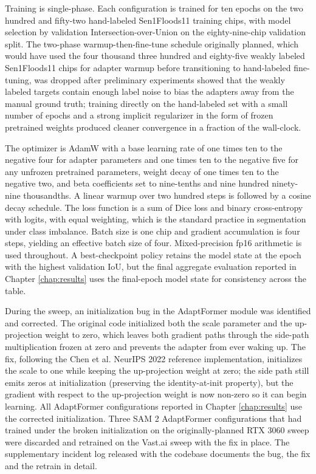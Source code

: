 \documentclass[11pt,a4paper,oneside]{report}
\begin{document}
Training is single-phase. Each configuration is trained for ten epochs on the two hundred and fifty-two hand-labeled Sen1Floods11 training chips, with model selection by validation Intersection-over-Union on the eighty-nine-chip validation split. The two-phase warmup-then-fine-tune schedule originally planned, which would have used the four thousand three hundred and eighty-five weakly labeled Sen1Floods11 chips for adapter warmup before transitioning to hand-labeled fine-tuning, was dropped after preliminary experiments showed that the weakly labeled targets contain enough label noise to bias the adapters away from the manual ground truth; training directly on the hand-labeled set with a small number of epochs and a strong implicit regularizer in the form of frozen pretrained weights produced cleaner convergence in a fraction of the wall-clock.

The optimizer is AdamW with a base learning rate of one times ten to the negative four for adapter parameters and one times ten to the negative five for any unfrozen pretrained parameters, weight decay of one times ten to the negative two, and beta coefficients set to nine-tenths and nine hundred ninety-nine thousandths. A linear warmup over two hundred steps is followed by a cosine decay schedule. The loss function is a sum of Dice loss and binary cross-entropy with logits, with equal weighting, which is the standard practice in segmentation under class imbalance. Batch size is one chip and gradient accumulation is four steps, yielding an effective batch size of four. Mixed-precision fp16 arithmetic is used throughout. A best-checkpoint policy retains the model state at the epoch with the highest validation IoU, but the final aggregate evaluation reported in Chapter \ref{chap:results} uses the final-epoch model state for consistency across the table.

During the sweep, an initialization bug in the AdaptFormer module was identified and corrected. The original code initialized both the scale parameter and the up-projection weight to zero, which leaves both gradient paths through the side-path multiplication frozen at zero and prevents the adapter from ever waking up. The fix, following the Chen et al. NeurIPS 2022 reference implementation, initializes the scale to one while keeping the up-projection weight at zero; the side path still emits zeros at initialization (preserving the identity-at-init property), but the gradient with respect to the up-projection weight is now non-zero so it can begin learning. All AdaptFormer configurations reported in Chapter \ref{chap:results} use the corrected initialization. Three SAM 2 AdaptFormer configurations that had trained under the broken initialization on the originally-planned RTX 3060 sweep were discarded and retrained on the Vast.ai sweep with the fix in place. The supplementary incident log released with the codebase documents the bug, the fix and the retrain in detail.
\end{document}
